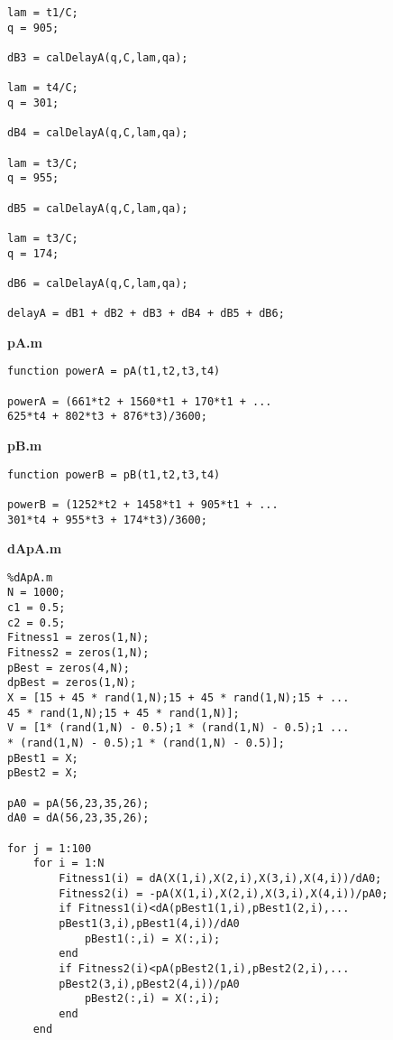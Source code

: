 \documentclass[a4paper,12pt]{article}
\begin{document}
\begin{CJK*}{UTF8}{gbsn}
\begin{lstlisting}
lam = t1/C;
q = 905;

dB3 = calDelayA(q,C,lam,qa);

lam = t4/C;
q = 301;

dB4 = calDelayA(q,C,lam,qa);

lam = t3/C;
q = 955;

dB5 = calDelayA(q,C,lam,qa);

lam = t3/C;
q = 174;

dB6 = calDelayA(q,C,lam,qa);

delayA = dB1 + dB2 + dB3 + dB4 + dB5 + dB6;
\end{lstlisting}

\noindent\textbf{pA.m}
\vspace{-15pt}
\lstset{basicstyle=\ttfamily\footnotesize,escapechar=`}
\begin{lstlisting}
function powerA = pA(t1,t2,t3,t4)

powerA = (661*t2 + 1560*t1 + 170*t1 + ...
625*t4 + 802*t3 + 876*t3)/3600;
\end{lstlisting}

\noindent\textbf{pB.m}
\vspace{-10pt}
\lstset{basicstyle=\ttfamily\footnotesize,escapechar=`}
\begin{lstlisting}
function powerB = pB(t1,t2,t3,t4)

powerB = (1252*t2 + 1458*t1 + 905*t1 + ...
301*t4 + 955*t3 + 174*t3)/3600;
\end{lstlisting}

\noindent\textbf{dApA.m}
\vspace{-15pt}
\lstset{basicstyle=\ttfamily\footnotesize,escapechar=`}
\begin{lstlisting}
%dApA.m
N = 1000;
c1 = 0.5;
c2 = 0.5;
Fitness1 = zeros(1,N);
Fitness2 = zeros(1,N);
pBest = zeros(4,N);
dpBest = zeros(1,N);
X = [15 + 45 * rand(1,N);15 + 45 * rand(1,N);15 + ...
45 * rand(1,N);15 + 45 * rand(1,N)];
V = [1* (rand(1,N) - 0.5);1 * (rand(1,N) - 0.5);1 ...
* (rand(1,N) - 0.5);1 * (rand(1,N) - 0.5)];
pBest1 = X;
pBest2 = X;

pA0 = pA(56,23,35,26);
dA0 = dA(56,23,35,26);

for j = 1:100
    for i = 1:N
        Fitness1(i) = dA(X(1,i),X(2,i),X(3,i),X(4,i))/dA0;
        Fitness2(i) = -pA(X(1,i),X(2,i),X(3,i),X(4,i))/pA0;
        if Fitness1(i)<dA(pBest1(1,i),pBest1(2,i),...
        pBest1(3,i),pBest1(4,i))/dA0
            pBest1(:,i) = X(:,i);
        end
        if Fitness2(i)<pA(pBest2(1,i),pBest2(2,i),...
        pBest2(3,i),pBest2(4,i))/pA0
            pBest2(:,i) = X(:,i);
        end
    end
    

\end{lstlisting}
\end{CJK*}
\end{document}
